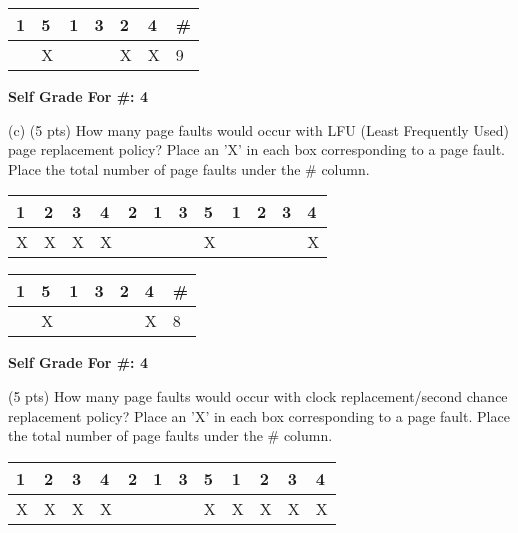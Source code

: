 \documentclass[conference]{IEEEtran}
\begin{document}
\begin{itemize}
\begin{table}[H]
	\centering
	\begin{tabular}{|l|l|l|l|l|l|l|}
		\hline
		\textbf{1} & \textbf{5} & \textbf{1} & \textbf{3} & \textbf{2} & \textbf{4} & \textbf{\#} \\ \hline
		& X &  &  & X & X & 9 \\ \hline
	\end{tabular}
\end{table}

\begin{center}
	\textbf{Self Grade For \#: 4}
\end{center}

(c) (5 pts) How many page faults would occur with LFU (Least Frequently Used) page
replacement policy? Place an 'X' in each box corresponding to a page fault. Place the total number
of page faults under the \# column.
\begin{table}[H]
	\centering
	\begin{tabular}{|l|l|l|l|l|l|l|l|l|l|l|l|}
		\hline
		\textbf{1} & \textbf{2} & \textbf{3} & \textbf{4} & \textbf{2} & \textbf{1} & \textbf{3} & \textbf{5} & \textbf{1} & \textbf{2} & \textbf{3} & \textbf{4} \\ \hline
		X & X & X & X &  &  &  & X &  &  &  & X \\ \hline
	\end{tabular}
\end{table}

\begin{table}[H]
	\centering
	\begin{tabular}{|l|l|l|l|l|l|l|}
		\hline
		\textbf{1} & \textbf{5} & \textbf{1} & \textbf{3} & \textbf{2} & \textbf{4} & \textbf{\#} \\ \hline
		& X &  &  &  & X & 8 \\ \hline
	\end{tabular}
\end{table}

\begin{center}
	\textbf{Self Grade For \#: 4}
\end{center}

(5 pts) How many page faults would occur with clock replacement/second chance
replacement policy? Place an 'X' in each box corresponding to a page fault. Place the total number
of page faults under the \# column.
\begin{table}[H]
	\centering
	\begin{tabular}{|l|l|l|l|l|l|l|l|l|l|l|l|}
		\hline
		\textbf{1} & \textbf{2} & \textbf{3} & \textbf{4} & \textbf{2} & \textbf{1} & \textbf{3} & \textbf{5} & \textbf{1} & \textbf{2} & \textbf{3} & \textbf{4} \\ \hline
		X & X & X & X &  &  &  & X & X & X & X & X \\ \hline
	\end{tabular}
\end{table}


\end{itemize}
\end{document}

